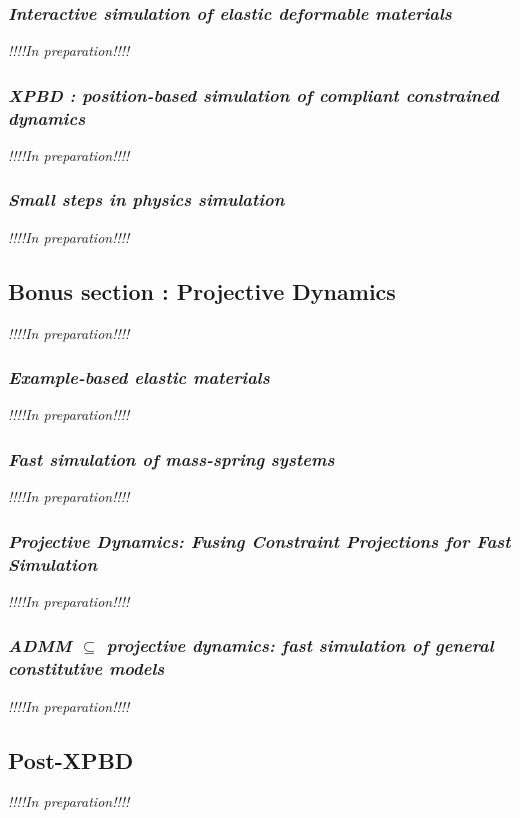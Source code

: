 \documentclass[pdflatex,sn-mathphys-num]{sn-jnl}%
\theoremstyle{thmstyleone}%
\theoremstyle{thmstyletwo}%
\theoremstyle{thmstylethree}%
\newcommand{\inprep}{
	\begin{center}
		\sl\rm {!!!!In preparation!!!!}
\end{center}}
\begin{document}
\subsubsection{{\sl Interactive simulation of elastic deformable materials}\cite{Servin2006InteractiveSO}}
\inprep
\subsubsection{\small{\sl XPBD : position-based simulation of compliant constrained dynamics}\cite{XPBD}}
\inprep

\subsubsection{{\sl Small steps in physics simulation}\cite{SmallSteps}}
\inprep
\subsection{Bonus section : Projective Dynamics}
\inprep
\subsubsection{{\sl Example-based elastic materials}\cite{Example-basedMartin}}
\inprep
\subsubsection{{\sl Fast simulation of mass-spring systems}\cite{fastMassTiantian}}
\inprep
\subsubsection{\small{\sl Projective Dynamics: Fusing Constraint Projections for Fast Simulation}\cite{ProjDyn}}
\inprep
\subsubsection{\small{\sl ADMM $\subseteq$ projective dynamics: fast simulation of general constitutive models}\cite{ADMM_Proj}}
\inprep

\subsection{Post-XPBD}
\inprep
\newpage
\appendix
\end{document}
